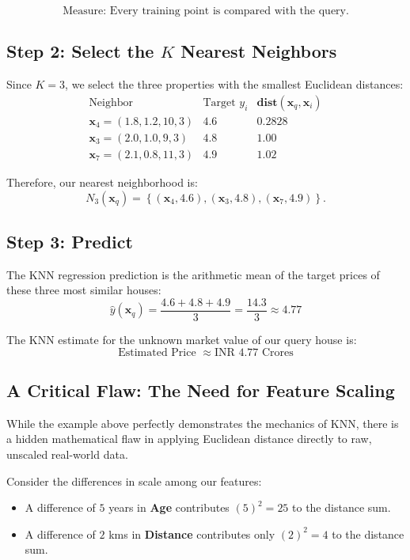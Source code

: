 \documentclass[12pt]{article}
\newcommand{\MVec}[1]{\mathbf{#1}}
\begin{document}
\[
    \boxed{
    \text{Measure: Every training point is compared with the query.}
    }
\]

\subsection*{Step 2: Select the $K$ Nearest Neighbors}
Since $K=3$, we select the three properties with the smallest
Euclidean distances:
\[
    \begin{array}{c|c|c}
        \text{Neighbor} & \text{Target } y_i & \mathbf{dist}(\MVec{x}_q,\MVec{x}_i) \\ \hline
        \MVec{x}_4=(1.8, 1.2, 10, 3) & 4.6 & 0.2828 \\
        \MVec{x}_3=(2.0, 1.0, 9, 3) & 4.8 & 1.00 \\
        \MVec{x}_7=(2.1, 0.8, 11, 3) & 4.9 & 1.02
    \end{array}
\]

Therefore, our nearest neighborhood is:
\[
    N_3(\MVec{x}_q) =
    \left\{
        (\MVec{x}_4, 4.6),
        (\MVec{x}_3, 4.8),
        (\MVec{x}_7, 4.9)
    \right\}.
\]

\subsection*{Step 3: Predict}
The KNN regression prediction is the arithmetic mean of the target
prices of these three most similar houses:
\[
    \hat{y}(\MVec{x}_q) = \frac{4.6 + 4.8 + 4.9}{3} = \frac{14.3}{3} \approx 4.77
\]

The KNN estimate for the unknown market value of our
query house is:
\[
    \boxed{
        \text{Estimated Price } \approx \text{INR } 4.77 \text{ Crores}
    }
\]

\newpage

\subsection*{A Critical Flaw: The Need for Feature Scaling}
While the example above perfectly demonstrates the mechanics of KNN,
there is a hidden mathematical flaw in applying Euclidean distance
directly to raw, unscaled real-world data.

Consider the differences in scale among our features:
\begin{itemize}
    \item A difference of $5$ years in \textbf{Age}
          contributes $(5)^2 = 25$ to the distance sum.
    \item A difference of $2$ kms in \textbf{Distance}
          contributes only $(2)^2 = 4$ to the distance sum.
\end{itemize}
\end{document}
